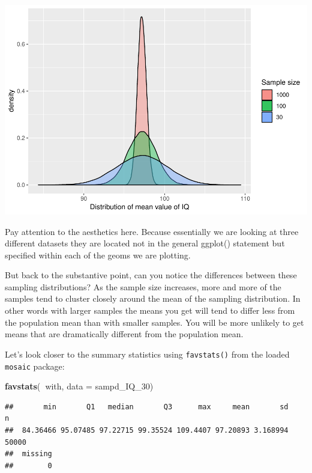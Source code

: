 \documentclass[]{book}
\newenvironment{Shaded}{\begin{snugshade}}{\end{snugshade}}
\newcommand{\DataTypeTok}[1]{\textcolor[rgb]{0.13,0.29,0.53}{#1}}
\newcommand{\DecValTok}[1]{\textcolor[rgb]{0.00,0.00,0.81}{#1}}
\newcommand{\KeywordTok}[1]{\textcolor[rgb]{0.13,0.29,0.53}{\textbf{#1}}}
\newcommand{\NormalTok}[1]{#1}
\newcommand{\OperatorTok}[1]{\textcolor[rgb]{0.81,0.36,0.00}{\textbf{#1}}}
\theoremstyle{definition}
\theoremstyle{definition}
\theoremstyle{definition}
\theoremstyle{remark}
\begin{document}
\includegraphics{05-inference_files/figure-latex/unnamed-chunk-15-1.pdf}

Pay attention to the aesthetics here. Because essentially we are looking
at three different datasets they are located not in the general ggplot()
statement but specified within each of the geoms we are plotting.

But back to the substantive point, can you notice the differences
between these sampling distributions? As the sample size increases, more
and more of the samples tend to cluster closely around the mean of the
sampling distribution. In other words with larger samples the means you
get will tend to differ less from the population mean than with smaller
samples. You will be more unlikely to get means that are dramatically
different from the population mean.

Let's look closer to the summary statistics using \texttt{favstats()}
from the loaded \texttt{mosaic} package:

\begin{Shaded}
\begin{Highlighting}[]
\KeywordTok{favstats}\NormalTok{(}\OperatorTok{~}\NormalTok{with, }\DataTypeTok{data =}\NormalTok{ sampd_IQ_}\DecValTok{30}\NormalTok{)}
\end{Highlighting}
\end{Shaded}

\begin{verbatim}
##       min       Q1   median       Q3      max     mean       sd     n
##  84.36466 95.07485 97.22715 99.35524 109.4407 97.20893 3.168994 50000
##  missing
##        0
\end{verbatim}
\end{document}
